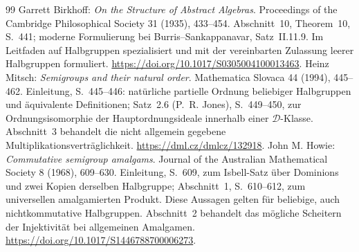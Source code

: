 \begin{thebibliography}{99}
Garrett Birkhoff: \emph{On the Structure of Abstract Algebras}.
Proceedings of the Cambridge Philosophical Society 31 (1935), 433--454.
Abschnitt~10, Theorem~10, S.~441; moderne Formulierung bei
Burris--Sankappanavar, Satz~II.11.9.
Im Leitfaden auf Halbgruppen spezialisiert und mit der vereinbarten
Zulassung leerer Halbgruppen formuliert.
\url{https://doi.org/10.1017/S0305004100013463}.
Heinz Mitsch: \emph{Semigroups and their natural order}.
Mathematica Slovaca 44 (1994), 445--462.
Einleitung, S.~445--446: natürliche partielle Ordnung beliebiger
Halbgruppen und äquivalente Definitionen; Satz~2.6 (P.~R. Jones),
S.~449--450, zur Ordnungsisomorphie der Hauptordnungsideale
innerhalb einer $\mathcal D$-Klasse. Abschnitt~3 behandelt
die nicht allgemein gegebene Multiplikationsverträglichkeit.
\url{https://dml.cz/dmlcz/132918}.
John M. Howie: \emph{Commutative semigroup amalgams}.
Journal of the Australian Mathematical Society 8 (1968), 609--630.
Einleitung, S.~609, zum Isbell-Satz über Dominions und zwei Kopien
derselben Halbgruppe; Abschnitt~1, S.~610--612, zum universellen
amalgamierten Produkt. Diese Aussagen gelten für beliebige,
auch nichtkommutative Halbgruppen. Abschnitt~2 behandelt das mögliche
Scheitern der Injektivität bei allgemeinen Amalgamen.
\url{https://doi.org/10.1017/S1446788700006273}.
\end{thebibliography}
